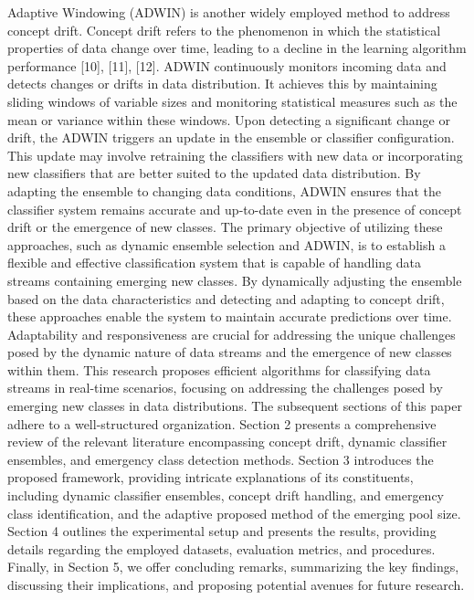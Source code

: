    Adaptive Windowing (ADWIN) is another widely employed method to address concept drift. Concept drift refers to the phenomenon in which the statistical properties of data change over time, leading to a decline in the learning algorithm performance [10], [11], [12]. ADWIN continuously monitors incoming data and detects changes or drifts in data distribution. It achieves this by maintaining sliding windows of variable sizes and monitoring statistical measures such as the mean or variance within these windows. Upon detecting a significant change or drift, the ADWIN triggers an update in the ensemble or classifier configuration. This update may involve retraining the classifiers with new data or incorporating new classifiers that are better suited to the updated data distribution. By adapting the ensemble to changing data conditions, ADWIN ensures that the classifier system remains accurate and up-to-date even in the presence of concept drift or the emergence of new classes. The primary objective of utilizing these approaches, such as dynamic ensemble selection and ADWIN, is to establish a flexible and effective classification system that is capable of handling data streams containing emerging new classes. By dynamically adjusting the ensemble based on the data characteristics and detecting and adapting to concept drift, these approaches enable the system to maintain accurate predictions over time. Adaptability and responsiveness are crucial for addressing the unique challenges posed by the dynamic nature of data streams and the emergence of new classes within them.  
  This research proposes efficient algorithms for classifying data streams in real-time scenarios, focusing on addressing the challenges posed by emerging new classes in data distributions. 
  The subsequent sections of this paper adhere to a well-structured organization. Section 2 presents a comprehensive review of the relevant literature encompassing concept drift, dynamic classifier ensembles, and emergency class detection methods. Section 3 introduces the proposed framework, providing intricate explanations of its constituents, including dynamic classifier ensembles, concept drift handling, and emergency class identification, and the adaptive proposed method of the emerging pool size. Section 4 outlines the experimental setup and presents the results, providing details regarding the employed datasets, evaluation metrics, and procedures. Finally, in Section 5, we offer concluding remarks, summarizing the key findings, discussing their implications, and proposing potential avenues for future research.
  
